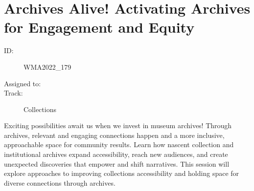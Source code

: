 \documentclass{report}
\begin{document}
              

              
        
          \newpage
          \section{ Archives Alive! Activating Archives for Engagement and Equity }
            \begin{description}
              \item [ID:]
              WMA2022\_179

              \item [Assigned to:]
                \item [Track:]Collections~
              \end{description}

              Exciting possibilities await us when we invest in museum archives! Through archives, relevant and engaging connections happen and a more inclusive, approachable space for community results. Learn how nascent collection and institutional archives expand accessibility, reach new audiences, and create unexpected discoveries that empower and shift narratives. This session will explore approaches to improving collections accessibility and holding space for diverse connections through archives.
\end{document}
